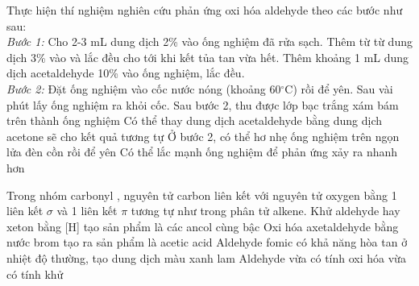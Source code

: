 \documentclass[12pt,a4paper]{article}
\begin{document}
\begin{ex}
Thực hiện thí nghiệm nghiên cứu phản ứng oxi hóa aldehyde theo các bước như sau:\\
\textit{Bước 1:} Cho 2-3 mL dung dịch  2\% vào ống nghiệm đã rửa sạch. Thêm từ từ dung dịch  3\% vào và lắc đều cho tới khi kết tủa tan vừa hết. Thêm khoảng 1 mL dung dịch acetaldehyde 10\% vào ống nghiệm, lắc đều.\\
\textit{Bước 2:} Đặt ống nghiệm vào cốc nước nóng (khoảng 60$^\circ$C) rồi để yên. Sau vài phút lấy ống nghiệm ra khỏi cốc.
\choiceTF
{\True Sau bước 2, thu được lớp bạc trắng xám bám trên thành ống nghiệm}
{Có thể thay dung dịch acetaldehyde bằng dung dịch acetone sẽ cho kết quả tương tự}
{\True Ở bước 2, có thể hơ nhẹ ống nghiệm trên ngọn lửa đèn cồn rồi để yên}
{Có thể lắc mạnh ống nghiệm để phản ứng xảy ra nhanh hơn}

\end{ex}

\begin{ex}
Trong nhóm carbonyl , nguyên tử carbon liên kết với nguyên tử oxygen bằng 1 liên kết $\sigma$ và 1 liên kết $\pi$ tương tự như trong phân tử alkene.
\choiceTF
{Khử aldehyde hay xeton bằng [H] tạo sản phẩm là các ancol cùng bậc}
{\True Oxi hóa axetaldehyde bằng nước brom tạo ra sản phẩm là acetic acid}
{Aldehyde fomic có khả năng hòa tan  ở nhiệt độ thường, tạo dung dịch màu xanh lam}
{\True Aldehyde vừa có tính oxi hóa vừa có tính khử}

\end{ex}
\end{document}
